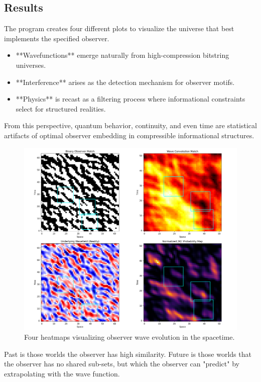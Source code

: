 \documentclass[12pt]{article}
\begin{document}
\subsection{Results}

The program creates four different plots to visualize the universe that best implements the specified observer.

\begin{itemize}
    \item **Wavefunctions** emerge naturally from high-compression bitstring universes.
    \item **Interference** arises as the detection mechanism for observer motifs.
    \item **Physics** is recast as a filtering process where informational constraints select for structured realities.
\end{itemize}

From this perspective, quantum behavior, continuity, and even time are statistical artifacts of optimal observer embedding in
compressible informational structures.

\begin{figure}[h!]
    \centering
    \includegraphics[width=1.0\textwidth]{figures/observer_wave_evolution.png}
    \caption{Four heatmaps visualizing observer wave evolution in the spacetime. }
    \label{fig:observer_wave_evolution}
\end{figure}

Past is those worlds the observer has high similarity. Future is those worlds that the observer has no shared sub-sets, but which the observer can "predict" by extrapolating with the wave function.
\end{document}
